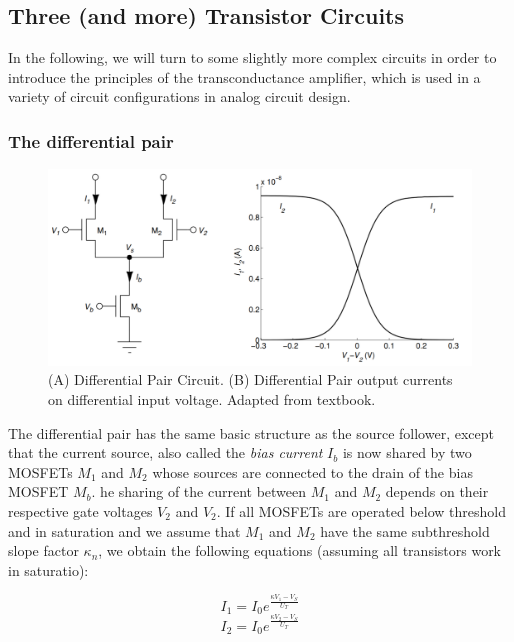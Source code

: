 \subsection{Three (and more) Transistor Circuits}

In the following, we will turn to some slightly more complex circuits in order to introduce the principles of the transconductance amplifier, which is used in a variety of circuit configurations in analog circuit design.

\subsubsection{The differential pair}

\begin{figure}[H]
    \centering
    \includegraphics[width=0.85\linewidth]{../../Figures/Differential_Pair.PNG}
    \caption{(A) Differential Pair Circuit. (B) Differential Pair output currents on differential input voltage. Adapted from textbook.}
    \label{fig:Differential_Pair}
\end{figure}

The differential pair has the same basic structure as the source follower, except that the current source, also called the \textit{bias current} $I_b$ is now shared by two MOSFETs $M_1$ and $M_2$ whose sources are connected to the drain of the bias MOSFET $M_b$. he sharing of the current between $M_1$ and $M_2$ depends on their respective gate voltages $V_2$ and $V_2$. If all MOSFETs are operated below threshold and in saturation and we assume that $M_1$ and $M_2$ have the same subthreshold slope factor $\kappa_n$, we obtain the following equations (assuming all transistors work in saturatio):

\begin{equation}
    I_1 = I_0 e^{\frac{\kappa V_1 - V_S}{U_T}}
\end{equation}
\begin{equation}
    I_2 = I_0 e^{\frac{\kappa V_2 - V_S}{U_T}}
\end{equation}

